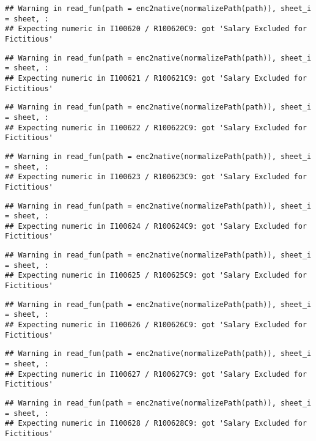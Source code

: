 \documentclass[
]{article}
\begin{document}
\begin{verbatim}
## Warning in read_fun(path = enc2native(normalizePath(path)), sheet_i = sheet, :
## Expecting numeric in I100620 / R100620C9: got 'Salary Excluded for Fictitious'
\end{verbatim}

\begin{verbatim}
## Warning in read_fun(path = enc2native(normalizePath(path)), sheet_i = sheet, :
## Expecting numeric in I100621 / R100621C9: got 'Salary Excluded for Fictitious'
\end{verbatim}

\begin{verbatim}
## Warning in read_fun(path = enc2native(normalizePath(path)), sheet_i = sheet, :
## Expecting numeric in I100622 / R100622C9: got 'Salary Excluded for Fictitious'
\end{verbatim}

\begin{verbatim}
## Warning in read_fun(path = enc2native(normalizePath(path)), sheet_i = sheet, :
## Expecting numeric in I100623 / R100623C9: got 'Salary Excluded for Fictitious'
\end{verbatim}

\begin{verbatim}
## Warning in read_fun(path = enc2native(normalizePath(path)), sheet_i = sheet, :
## Expecting numeric in I100624 / R100624C9: got 'Salary Excluded for Fictitious'
\end{verbatim}

\begin{verbatim}
## Warning in read_fun(path = enc2native(normalizePath(path)), sheet_i = sheet, :
## Expecting numeric in I100625 / R100625C9: got 'Salary Excluded for Fictitious'
\end{verbatim}

\begin{verbatim}
## Warning in read_fun(path = enc2native(normalizePath(path)), sheet_i = sheet, :
## Expecting numeric in I100626 / R100626C9: got 'Salary Excluded for Fictitious'
\end{verbatim}

\begin{verbatim}
## Warning in read_fun(path = enc2native(normalizePath(path)), sheet_i = sheet, :
## Expecting numeric in I100627 / R100627C9: got 'Salary Excluded for Fictitious'
\end{verbatim}

\begin{verbatim}
## Warning in read_fun(path = enc2native(normalizePath(path)), sheet_i = sheet, :
## Expecting numeric in I100628 / R100628C9: got 'Salary Excluded for Fictitious'
\end{verbatim}
\end{document}
